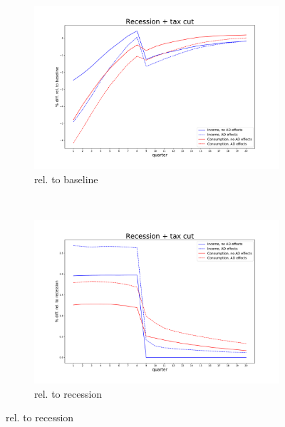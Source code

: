 \documentclass[]{article}
\begin{document}
\begin{figure}
	\centering
	\begin{subfigure}[b]{\textwidth}
		\centering
		\includegraphics[width=\linewidth]{../full_run/recession_taxcut_relbaseline}
		\caption{rel. to baseline}
		\label{fig:recessiontaxcutrelbaseline}
	\end{subfigure}\\
	\hfill
	\begin{subfigure}[b]{\textwidth}
	\centering
	\includegraphics[width=\linewidth]{../full_run/recession_taxcut_relrecession}
	\caption{rel. to recession}
	\label{fig:recessiontaxcutrelrecession}
	\end{subfigure}
\end{figure}
\end{document}
